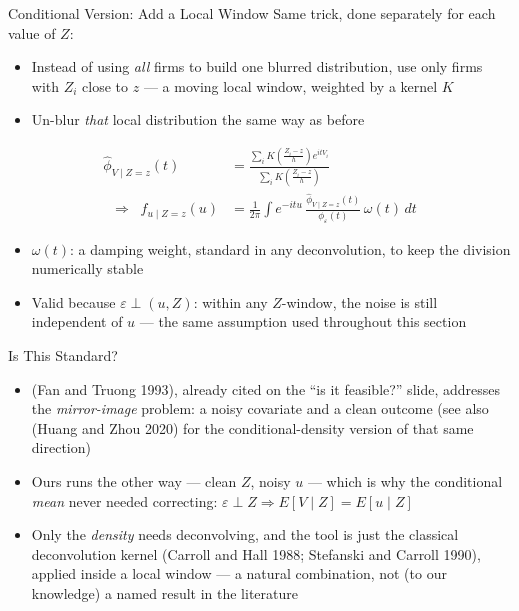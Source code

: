 \documentclass[
  ignorenonframetext,
  aspectratio=169,
]{beamer}
\providecommand{\tightlist}{%
  \setlength{\itemsep}{0pt}\setlength{\parskip}{0pt}}
\begin{document}
\begin{frame}{Conditional Version: Add a Local Window}
\protect{}\label{conditional-version-add-a-local-window}
Same trick, done separately for each value of \(Z\):

\begin{itemize}
\tightlist
\item
  Instead of using \emph{all} firms to build one blurred distribution,
  use only firms with \(Z_i\) close to \(z\) --- a moving local window,
  weighted by a kernel \(K\)
\item
  Un-blur \emph{that} local distribution the same way as before
\end{itemize}

\[
\begin{aligned}
\hat\phi_{V\mid Z=z}(t)&=\frac{\sum_i K\!\left(\frac{Z_i-z}{h}\right)e^{itV_i}}{\sum_i K\!\left(\frac{Z_i-z}{h}\right)}\\[4pt]
\;\;\Longrightarrow\;\;\hat f_{u\mid Z=z}(u)&=\frac{1}{2\pi}\int e^{-itu}\,\frac{\hat\phi_{V\mid Z=z}(t)}{\phi_\varepsilon(t)}\,\omega(t)\,dt
\end{aligned}
\]

\begin{itemize}
\tightlist
\item
  \(\omega(t)\): a damping weight, standard in any deconvolution, to
  keep the division numerically stable
\item
  Valid because \(\varepsilon\perp(u,Z)\): within any \(Z\)-window, the
  noise is still independent of \(u\) --- the same assumption used
  throughout this section
\end{itemize}
\end{frame}

\begin{frame}{Is This Standard?}
\protect{}\label{is-this-standard}
\begin{itemize}
\tightlist
\item
  (Fan and Truong 1993), already cited on the ``is it feasible?'' slide,
  addresses the \emph{mirror-image} problem: a noisy covariate and a
  clean outcome (see also (Huang and Zhou 2020) for the
  conditional-density version of that same direction)
\item
  Ours runs the other way --- clean \(Z\), noisy \(u\) --- which is why
  the conditional \emph{mean} never needed correcting:
  \(\varepsilon\perp Z \Rightarrow E[V\mid Z]=E[u\mid Z]\)
\item
  Only the \emph{density} needs deconvolving, and the tool is just the
  classical deconvolution kernel (Carroll and Hall 1988; Stefanski and
  Carroll 1990), applied inside a local window --- a natural
  combination, not (to our knowledge) a named result in the literature
\end{itemize}
\end{frame}
\end{document}
